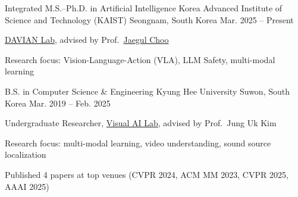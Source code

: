 
\begin{cventries}

  \cventry
    {Integrated M.S.--Ph.D. in Artificial Intelligence}
    {Korea Advanced Institute of Science and Technology (KAIST)}
    {Seongnam, South Korea}
    {Mar. 2025 -- Present}
    {%
      \begin{cvitems}
        \item \href{https://davian.kaist.ac.kr/}{DAVIAN Lab}, advised by Prof.\ \href{https://sites.google.com/site/jaegulchoo/}{Jaegul Choo}
        \item Research focus: Vision-Language-Action (VLA), LLM Safety, multi-modal learning
      \end{cvitems}
    }

  \cventry
    {B.S. in Computer Science \& Engineering}
    {Kyung Hee University}
    {Suwon, South Korea}
    {Mar. 2019 -- Feb. 2025}
    {%
      \begin{cvitems}
        \item Undergraduate Researcher, \href{https://visualai.khu.ac.kr/}{Visual AI Lab}, advised by Prof.\ Jung Uk Kim
        \item Research focus: multi-modal learning, video understanding, sound source localization
        \item Published 4 papers at top venues (CVPR 2024, ACM MM 2023, CVPR 2025, AAAI 2025)
      \end{cvitems}
    }

\end{cventries}
